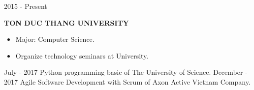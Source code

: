 
\begin{scholarship}
	\scholarshipentry%
		{2015 - Present}
		{
			\textbf{TON DUC THANG UNIVERSITY}
			\begin{itemize}
				\item Major: Computer Science.
				\item Organize technology seminars at University.
			\end{itemize}		
		}
	\scholarshipentry%
		{July - 2017}
		{
			Python programming basic of The University of Science.
		}
		\scholarshipentry%
	{December - 2017}
	{
		Agile Software Development with Scrum of Axon Active Vietnam Company.	
	}
\end{scholarship}
